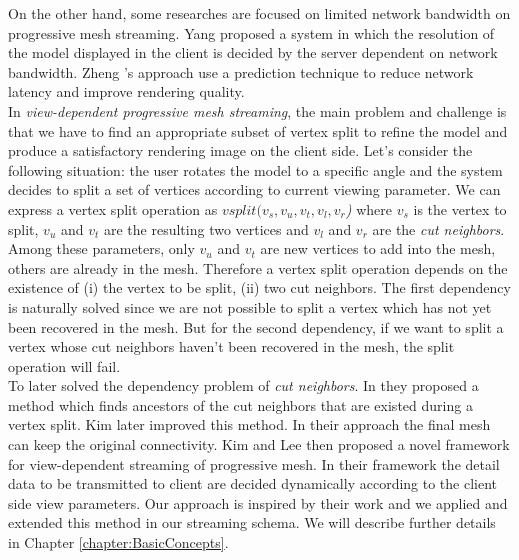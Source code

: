 On the other hand, some researches are focused on limited network bandwidth on progressive mesh streaming. Yang \etal \cite{Yang:2004:VDMeshTrans} proposed a system in which the resolution of the model displayed in the client is decided by the server dependent on network bandwidth. Zheng \etal's approach \cite{Zheng:08:IVRN} use a prediction technique to reduce network latency and improve rendering quality. \\

In \emph{view-dependent progressive mesh streaming}, the main problem and challenge is that we have to find an appropriate subset of vertex split to refine the model and produce a satisfactory rendering image on the client side. Let's consider the following situation: the user rotates the model to a specific angle and the system decides to split a set of vertices according to current viewing parameter. We can express a vertex split operation as \emph{$vsplit(v_s, v_u, v_t, v_l, v_r$)} where \emph{$v_s$} is the vertex to split, \emph{$v_u$} and \emph{$v_t$} are the resulting two vertices and \emph{$v_l$} and \emph{$v_r$} are the \emph{cut neighbors}. Among these parameters, only $v_u$ and $v_t$ are new vertices to add into the mesh, others are already in the mesh. Therefore a vertex split operation depends on the existence of (i) the vertex to be split, (ii) two cut neighbors. The first dependency is naturally solved since we are not possible to split a vertex which has not yet been recovered in the mesh. But for the second dependency, if we want to split a vertex whose cut neighbors haven't been recovered in the mesh, the split operation will fail. \\

To \etal later solved the dependency problem of \emph{cut neighbors}. In \cite{To:1999:MPS} they proposed a method which finds ancestors of the cut neighbors that are existed during a vertex split. Kim \etal \cite{Kim:2001:trulyselective} later improved this method. In their approach the final mesh can keep the original connectivity. Kim and Lee \etal\cite{Kim:04:VDstreaming} then proposed a novel framework for view-dependent streaming of progressive mesh. In their framework the detail data to be transmitted to client are decided dynamically according to the client side view parameters. Our approach is inspired by their work and we applied and extended this method in our streaming schema. We will describe further details in Chapter \ref{chapter:BasicConcepts}. \\






